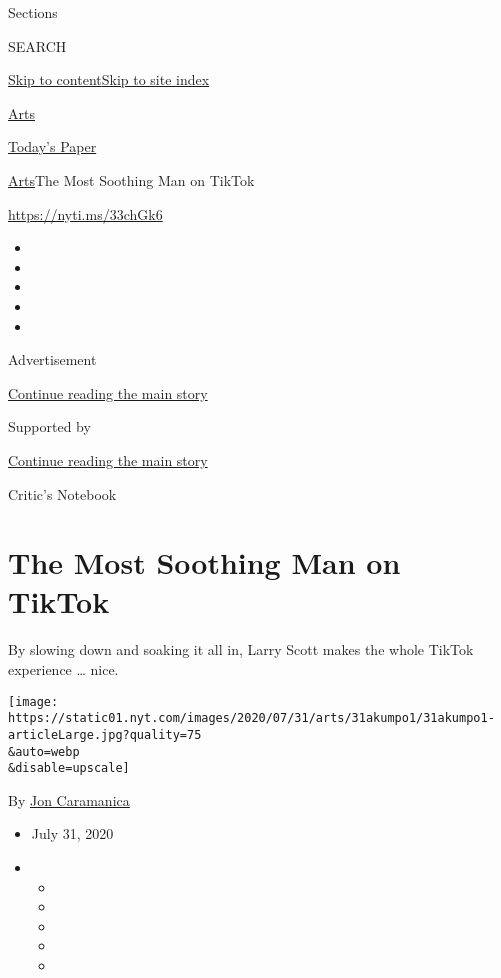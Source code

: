 Sections

SEARCH

\protect\hyperlink{site-content}{Skip to
content}\protect\hyperlink{site-index}{Skip to site index}

\href{https://www.nytimes.com/section/arts}{Arts}

\href{https://myaccount.nytimes.com/auth/login?response_type=cookie\&client_id=vi}{}

\href{https://www.nytimes.com/section/todayspaper}{Today's Paper}

\href{/section/arts}{Arts}\textbar{}The Most Soothing Man on TikTok

\url{https://nyti.ms/33chGk6}

\begin{itemize}
\item
\item
\item
\item
\item
\end{itemize}

Advertisement

\protect\hyperlink{after-top}{Continue reading the main story}

Supported by

\protect\hyperlink{after-sponsor}{Continue reading the main story}

Critic's Notebook

\hypertarget{the-most-soothing-man-on-tiktok}{%
\section{The Most Soothing Man on
TikTok}\label{the-most-soothing-man-on-tiktok}}

By slowing down and soaking it all in, Larry Scott makes the whole
TikTok experience \ldots{} nice.

\texttt{[image: https://static01.nyt.com/images/2020/07/31/arts/31akumpo1/31akumpo1-articleLarge.jpg?quality=75\\\&auto=webp\\\&disable=upscale]}

By \href{https://www.nytimes.com/by/jon-caramanica}{Jon Caramanica}

\begin{itemize}
\item
  July 31, 2020
\item
  \begin{itemize}
  \item
  \item
  \item
  \item
  \item
  \end{itemize}
\end{itemize}

